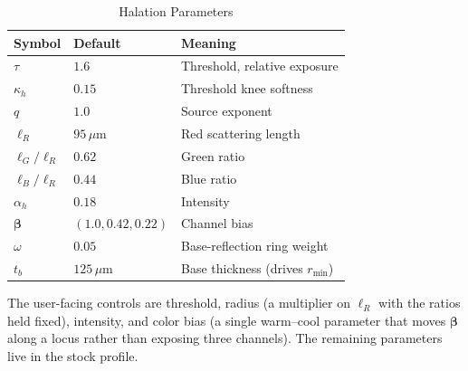 \begin{table}[htbp]
\caption{Halation Parameters}
\label{tab:halparams}
\begin{center}
\renewcommand{\arraystretch}{1.15}
\begin{tabularx}{\columnwidth}{@{}ll>{\raggedright\arraybackslash}X@{}}
\toprule
\textbf{Symbol} & \textbf{Default} & \textbf{Meaning} \\
\midrule
$\tau$        & $1.6$   & Threshold, relative exposure \\
$\kappa_h$    & $0.15$  & Threshold knee softness \\
$q$           & $1.0$   & Source exponent \\
$\ell_R$      & $95\,\mu$m & Red scattering length \\
$\ell_G/\ell_R$ & $0.62$ & Green ratio \\
$\ell_B/\ell_R$ & $0.44$ & Blue ratio \\
$\alpha_h$    & $0.18$  & Intensity \\
$\boldsymbol{\beta}$ & $(1.0, 0.42, 0.22)$ & Channel bias \\
$\omega$      & $0.05$  & Base-reflection ring weight \\
$t_b$         & $125\,\mu$m & Base thickness (drives $r_{\min}$) \\
\bottomrule
\end{tabularx}
\end{center}
\end{table}

The user-facing controls are threshold, radius (a multiplier on $\ell_R$ with the
ratios held fixed), intensity, and color bias (a single warm--cool parameter that
moves $\boldsymbol{\beta}$ along a locus rather than exposing three channels).
The remaining parameters live in the stock profile.
